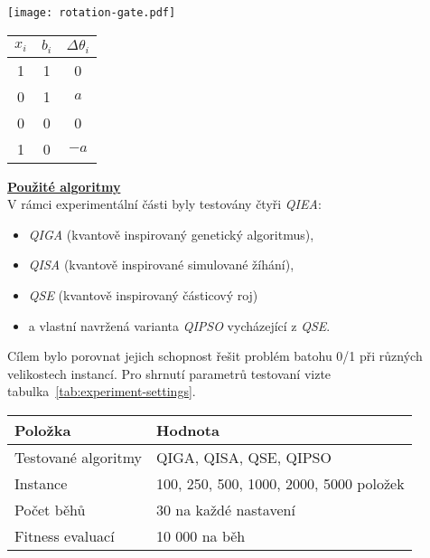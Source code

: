 \begin{minipage}{0.49\linewidth}
    \centering
    \texttt{[image: rotation-gate.pdf]}
    \label{fig:rotation-gate}
\end{minipage}
\hfill
\begin{minipage}{0.49\linewidth}
    \centering
    \begin{tabular}{c c|c}
    \toprule
    $x_i$ & $b_i$ & $\Delta\theta_i$ \\
    \midrule
    1 & 1 & 0 \\
    0 & 1 & $a$ \\
    0 & 0 & 0 \\
    1 & 0 & $-a$ \\
    \bottomrule
    \end{tabular}
    \label{tab:look-up-table-Delta}
\end{minipage}

\vspace{0.5em}

{\large\underline{\textbf{Použité algoritmy}}} \\[0.5em]
V rámci experimentální části byly testovány čtyři \emph{QIEA}:
\begin{itemize}
  \item \emph{QIGA} (kvantově inspirovaný genetický algoritmus),
  \item \emph{QISA} (kvantově inspirované simulované žíhání),
  \item \emph{QSE} (kvantově inspirovaný částicový roj)
  \item a vlastní navržená varianta \emph{QIPSO} vycházející z \emph{QSE}.
\end{itemize}
Cílem bylo porovnat jejich schopnost řešit problém batohu 0/1 při různých velikostech instancí.
Pro shrnutí parametrů testovaní vizte tabulka~\ref{tab:experiment-settings}.

\vspace{0.5em}

\begin{minipage}{\linewidth}
  \centering
  \begin{tabular}{|l|l|}
  \hline
  \textbf{Položka} & \textbf{Hodnota} \\
  \hline
  Testované algoritmy & QIGA, QISA, QSE, QIPSO \\
  \hline
  Instance & 100, 250, 500, 1000, 2000, 5000 položek \\
  \hline
  Počet běhů & 30 na každé nastavení \\
  \hline
  Fitness evaluací & 10 000 na běh \\
  \hline
  \end{tabular}
  \label{tab:experiment-settings}
\end{minipage}
\vspace{0.5em}
